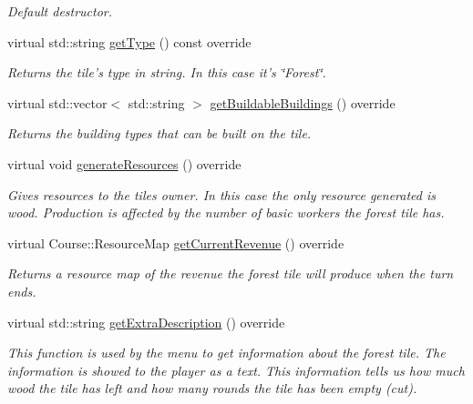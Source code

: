 \begin{DoxyCompactItemize}
\begin{DoxyCompactList}\small\item\em Default destructor. \end{DoxyCompactList}\item 
virtual std\-::string \hyperlink{class_course_1_1_forest_a783378b8f5c1ec5d0c5c4a771291a902}{get\-Type} () const override
\begin{DoxyCompactList}\small\item\em Returns the tile's type in string. In this case it's \char`\"{}\-Forest\char`\"{}. \end{DoxyCompactList}\item 
virtual std\-::vector$<$ std\-::string $>$ \hyperlink{class_course_1_1_forest_a2d5516341461262b1af43717ac726ffb}{get\-Buildable\-Buildings} () override
\begin{DoxyCompactList}\small\item\em Returns the building types that can be built on the tile. \end{DoxyCompactList}\item 
virtual void \hyperlink{class_course_1_1_forest_a60952005c6e4640dbc81d41f590ea773}{generate\-Resources} () override
\begin{DoxyCompactList}\small\item\em Gives resources to the tiles owner. In this case the only resource generated is wood. Production is affected by the number of basic workers the forest tile has. \end{DoxyCompactList}\item 
virtual Course\-::\-Resource\-Map \hyperlink{class_course_1_1_forest_aa6f9a231432540a9364fa5405bed98b3}{get\-Current\-Revenue} () override
\begin{DoxyCompactList}\small\item\em Returns a resource map of the revenue the forest tile will produce when the turn ends. \end{DoxyCompactList}\item 
virtual std\-::string \hyperlink{class_course_1_1_forest_a03d5f409f71eb15a1e8d66c87235386c}{get\-Extra\-Description} () override
\begin{DoxyCompactList}\small\item\em This function is used by the menu to get information about the forest tile. The information is showed to the player as a text. This information tells us how much wood the tile has left and how many rounds the tile has been empty (cut). \end{DoxyCompactList}\end{DoxyCompactItemize}
